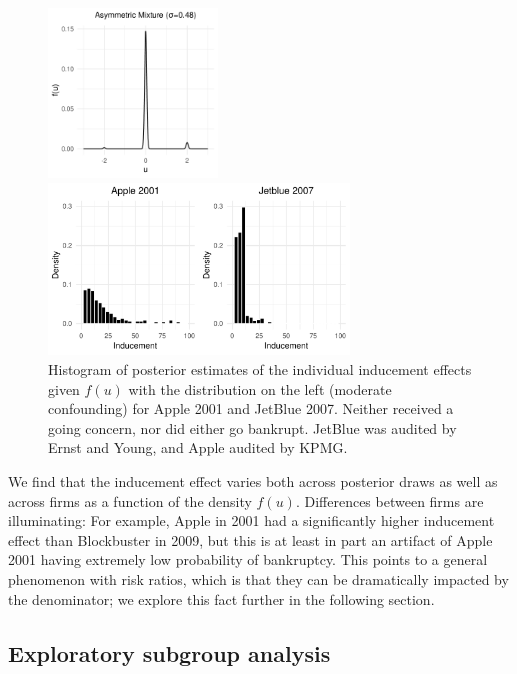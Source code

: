 \documentclass[aoas,preprint, 11pt, dvipsnames, table, x11name]{imsart}
\theoremstyle{remark}
\begin{document}
	\begin{figure}[h]
		\centering	\begin{minipage}{.3\textwidth}
			\includegraphics[width=4.5cm]{rightbump2}
		\end{minipage}%
		\begin{minipage}{.5\textwidth}
			
			\includegraphics[width=8cm]{Apple_jetblue_right_RR}
		\end{minipage}
		\caption[Apple vs Jetblue]{Histogram of posterior estimates of the individual inducement effects given $f(u)$ with the distribution on the left (moderate confounding) for Apple 2001 and JetBlue 2007.  Neither received a going concern, nor did either go bankrupt.  JetBlue was audited by Ernst and Young, and Apple audited by KPMG.} 
		\label{individ_firm_plot}
	\end{figure}
	We find that the inducement effect varies both across posterior draws as well as across firms as a function of the density $f(u)$.  Differences between firms are illuminating: For example, Apple in 2001 had a significantly higher inducement effect than Blockbuster in 2009, but this is at least in part an artifact of Apple 2001 having extremely low probability of bankruptcy. This points to a general phenomenon with risk ratios, which is that they can be dramatically impacted by the denominator; we explore this fact further in the following section.
	
	\subsection{Exploratory subgroup analysis}\label{4.5} 
	
\end{document}
